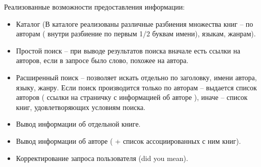\documentclass[a4paper]{report}
\begin{document}
Реализованные возможности предоставления информации:
\begin{itemize}
	\item Каталог (В каталоге реализованы различные разбиения множества книг -- по авторам ( внутри разбиение по первым 1/2 буквам имени), языкам, жанрам).
	\item Простой поиск -- при выводе результатов поиска вначале есть ссылки на авторов, если в запросе было слово, похожее на автора.
	\item Расширенный поиск -- позволяет искать отдельно по заголовку, имени автора, языку, жанру. Если поиск производится только по авторам -- выдается список авторов ( ссылки на страничку с информацией об авторе ), иначе -- список книг, удовлетворяющих условиям поиска.
\item Вывод информации об отдельной книге.
\item Вывод информации об авторе ( + список ассоциированных с ним книг).
\item Корректирование запроса пользователя (did you mean).
\end{itemize}




 

\end{document}
